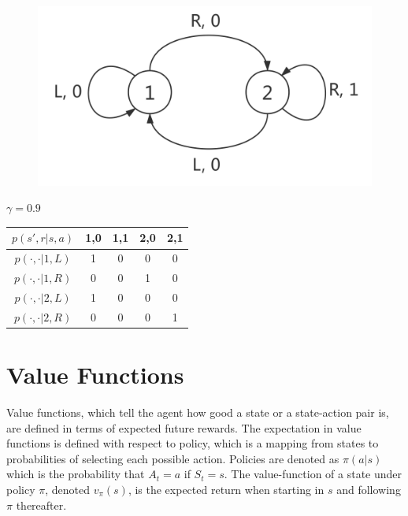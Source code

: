 \documentclass[twoside]{article}
\begin{document}
\begin{figure}[!hbp]
  \centering
  \includegraphics[scale=0.2]{images/mdp.png}
  \label{fig: function_space}
\end{figure}
\begin{center}
	$\gamma=0.9$
\end{center}
\begin{table}[htb!]
\centering
\begin{tabular}{c|cccc}
\hline
$p(s', r|s,a)$ & 1,0 & 1,1 & 2,0 & 2,1 \\
\hline
$p(\cdot, \cdot|1, L)$ & 1 & 0 & 0 & 0 \\
\hline
$p(\cdot, \cdot|1, R)$ & 0 & 0 & 1 & 0 \\
\hline
$p(\cdot, \cdot|2, L)$ & 1 & 0 & 0 & 0 \\
\hline
$p(\cdot, \cdot|2, R)$ & 0 & 0 & 0 & 1 \\
\hline

\end{tabular}
\end{table}

\section{Value Functions}

 Value functions, which tell the agent how good a state or a state-action pair is, are defined in terms of expected future rewards. The expectation in value functions is defined with respect to policy, which is a mapping from states to probabilities of selecting each possible action. Policies are denoted as $\pi(a|s)$ which is the probability that $A_t=a$ if $S_t=s$. The value-function of a state under policy $\pi$, denoted $v_\pi(s)$, is the expected return when starting in $s$ and following $\pi$ thereafter. 
 
\end{document}
